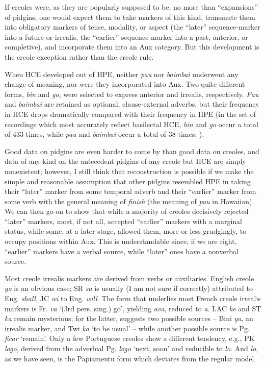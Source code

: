 If creoles were, as they are popularly supposed to be, no more than ``expansions'' of pidgins, one would expect them to take markers of this kind, transmute them into obligatory markers of tense, modal\-ity, or aspect (the ``later'' sequence-marker into a future or irrealis, the ``earlier'' sequence-marker into a past, anterior, or completive), and incorporate them into an Aux category. But this development is the creole exception rather than the creole rule.

When HCE developed out of HPE, neither \textit{pau} nor \textit{baimbai} underwent any change of meaning, nor were they incorporated into Aux. Two quite different forms, \textit{bin} and \textit{go}, were selected to express anterior and irrealis, respectively. \textit{Pau} and \textit{baimbai} are retained as optional, clause-external adverbs, but their frequency in HCE drops dramatically compared with their frequency in HPE (in the set of recordings which most accurately reflect basilectal HCE, \textit{bin} and \textit{go} occur a total of 433 times, while \textit{pau} and \textit{baimbai} occur a total of 38 times; \citealt[Tables 3.1, 3.6, 3.9]{Bickerton1977}).

Good data on pidgins are even harder to come by than good data on creoles, and data of any kind on the antecedent pidgins of any creole but HCE are simply nonexistent; however, I still think that reconstruction is possible if we make the simple and reasonable assump\-tion that other pidgins resembled HPE in taking their ``later'' marker from some temporal adverb and their ``earlier'' marker from some verb with the general meaning of \textit{finish} (the meaning of \textit{pau} in Hawaiian). We can then go on to show that while a majority of creoles decisively rejected ``later'' markers, most, if not all, accepted ``earlier'' markers with a marginal status, while some, at a later stage, allowed them, more or less grudgingly, to occupy positions within Aux. This is under\-standable since, if we are right, ``earlier'' markers have a verbal source, while ``later'' ones have a nonverbal source.

Most creole irrealis markers are derived from verbs or auxiliaries. English creole \textit{go} is an obvious case; SR \textit{sa} is usually (I am not sure if correctly) attributed to Eng. \textit{shall}, JC \textit{wi} to Eng. \textit{will}. The form that underlies most French creole irrealis markers is Fr. \textit{va} `(3rd pers. sing.) go', yielding \textit{ava}, reduced to \textit{a}. LAC \textit{ke} and ST \textit{ka} remain mysterious; for the latter, \citet{Ferraz1979} suggests two possible sources -- Bini \textit{ya}, an irrealis marker, and Twi \textit{ka} `to be usual' -- while another possible source is Pg. \textit{ficar} `remain'. Only a few Portuguese creoles show a different tendency, e.g., PK \textit{logo}, derived from the adverbial Pg. \textit{logo} `next,
soon' and reducible to \textit{lo}. And \textit{lo}, as we have seen, is the Papiamentu form which deviates from the regular model.

